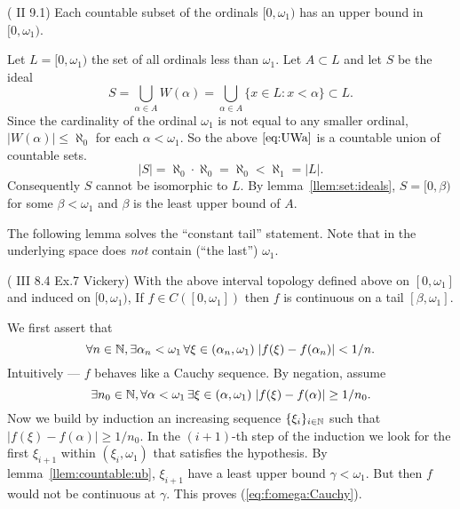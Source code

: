 \begin{enumerate}
\begin{llem} \label{llem:countable:ub}
\textnormal{(\cite{Dug1966} \textsf{II 9.1})}
Each countable subset of the ordinals \([0,\omega_1)\) has an upper bound in
 \([0,\omega_1)\).
\end{llem}
\begin{thmproof}
Let \(L = [0,\omega_1) \) the set of all ordinals less than \(\omega_1\).
Let \(A\subset L\) and let $S$ be the ideal
\begin{equation} \label{eq:UWa}
  S =
  \bigcup_{\alpha\in A} W(\alpha) = \bigcup_{\alpha\in A} \{x\in L: x< \alpha\}
  \subset L.
\end{equation}
Since the cardinality of the ordinal \(\omega_1\) is not equal
to any smaller ordinal, \(|W(\alpha)| \leq \aleph_0\)
for each \(\alpha < \omega_1\).
So the above \(\ref{eq:UWa}\) is a countable union of countable sets.
\begin{equation*}
 |S| = \aleph_0 \cdot  \aleph_0 = \aleph_0 < \aleph_1 = |L|.
\end{equation*}
Consequently $S$ cannot be isomorphic to $L$. By lemma~\ref{llem:set:ideals},
\(S=[0,\beta)\) for some \(\beta < \omega_1\) and \(\beta\) is
the least upper bound of $A$.
\end{thmproof}

The following lemma solves the ``constant tail'' statement.
Note that in \cite{Dug1966} the underlying  space does \emph{not}
contain (``the last'') \(\omega_1\).

\begin{llem} \textnormal{(\cite{Dug1966} \textsf{III 8.4 Ex.7}
                         \textrm{Vickery})}
 \label{llem:Vickery}
With the above interval topology defined above on \([0,\omega_1]\) and
induced on \([0,\omega_1)\),
If \(f\in C([0,\omega_1])\)
then $f$ is continuous on a tail \([\beta,\omega_1]\).
\end{llem}
\begin{thmproof}
We first assert that
\begin{equation} \label{eq:f:omega:Cauchy}
 \forall n\in\mathbb{N},
 \exists \alpha_n < \omega_1\,
 \forall \xi \in (\alpha_n,\omega_1)\;
         |f(\xi) - f(\alpha_n)| < 1/n.
\end{equation}
Intuitively --- $f$ behaves like a Cauchy sequence.
By negation, assume
\begin{equation*}
 \exists n_0\in\mathbb{N},
 \forall \alpha < \omega_1\,
 \exists \xi \in (\alpha,\omega_1)\;
         |f(\xi) - f(\alpha)| \geq 1/n_0.
\end{equation*}
Now we build by induction an increasing sequence \(\{\xi_i\}_{i\in \mathbb{N}}\)
such that \(|f(\xi) - f(\alpha)| \geq 1/n_0\).
In the  \((i+1)\)-th step of the induction we look for the first \(\xi_{i+1}\)
within \((\xi_i,\omega_1)\) that satisfies the hypothesis.
By lemma~\ref{llem:countable:ub}, \(\xi_{i+1}\) have a least upper bound
\(\gamma < \omega_1\). But then $f$ would not be continuous at \(\gamma\).
This proves (\ref{eq:f:omega:Cauchy}).



\end{thmproof}
\end{enumerate}
